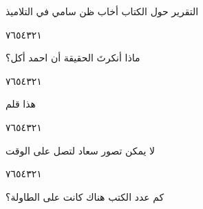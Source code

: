 \documentclass[11pt, a4paper]{article}
\begin{document}
{\vspace{0.5\baselineskip}\begin{flushright}
\textarabic{التقرير حول الكتاب أخاب ظن سامي في التلاميذ}
\end{flushright}

\begin{center}
        \hfill\textarabic{٧}\hfill\textarabic{٦}\hfill\textarabic{٥}\hfill\textarabic{٤}\hfill\textarabic{٣}\hfill\textarabic{٢}\hfill\textarabic{١}
        \end{center}

\vfill\clearpage

\vspace{0.5\baselineskip}\begin{flushright}
\textarabic{ماذا أنكرتَ الحقيقة أن احمد أكل؟}
\end{flushright}

\begin{center}
        \hfill\textarabic{٧}\hfill\textarabic{٦}\hfill\textarabic{٥}\hfill\textarabic{٤}\hfill\textarabic{٣}\hfill\textarabic{٢}\hfill\textarabic{١}
        \end{center}


\vspace{0.5\baselineskip}\begin{flushright}
\textarabic{هذا قلم}
\end{flushright}

\begin{center}
        \hfill\textarabic{٧}\hfill\textarabic{٦}\hfill\textarabic{٥}\hfill\textarabic{٤}\hfill\textarabic{٣}\hfill\textarabic{٢}\hfill\textarabic{١}
        \end{center}


\vspace{0.5\baselineskip}\begin{flushright}
\textarabic{لا يمكن تصور سعاد لتصل على الوقت}
\end{flushright}

\begin{center}
        \hfill\textarabic{٧}\hfill\textarabic{٦}\hfill\textarabic{٥}\hfill\textarabic{٤}\hfill\textarabic{٣}\hfill\textarabic{٢}\hfill\textarabic{١}
        \end{center}


\vspace{0.5\baselineskip}\begin{flushright}
\textarabic{كم عدد الكتب هناك كانت على الطاولة؟}
\end{flushright}

}
\end{document}
